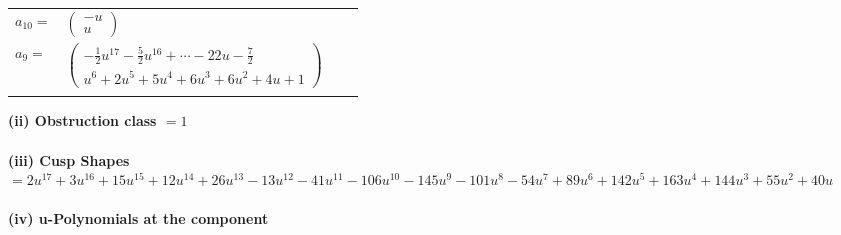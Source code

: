 \documentclass[1p]{elsarticle_modified}
\theoremstyle{definition}
\begin{document}
\begin{tabular}{m{7pt} m{180pt} m{7pt} m{180pt} }
\flushright $a_{10}=$&$\begin{pmatrix}- u\\u\end{pmatrix}$ \\
\flushright $a_{9}=$&$\begin{pmatrix}-\frac{1}{2} u^{17}-\frac{5}{2} u^{16}+\cdots-22 u-\frac{7}{2}\\u^6+2 u^5+5 u^4+6 u^3+6 u^2+4 u+1\end{pmatrix}$\\&\end{tabular}
\flushleft \textbf{(ii) Obstruction class $= 1$}\\~\\
\flushleft \textbf{(iii) Cusp Shapes $= 2 u^{17}+3 u^{16}+15 u^{15}+12 u^{14}+26 u^{13}-13 u^{12}-41 u^{11}-106 u^{10}-145 u^9-101 u^8-54 u^7+89 u^6+142 u^5+163 u^4+144 u^3+55 u^2+40 u$}\\~\\
\newpage\renewcommand{\arraystretch}{1}
\flushleft \textbf{(iv) u-Polynomials at the component}\newline \\
\end{document}
